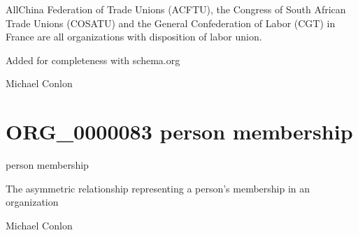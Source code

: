 \documentclass[letterpaper,10pt,english]{sphinxmanual}
\begin{document}
\begin{sphinxShadowBox}

\sphinxAtStartPar
All\sphinxhyphen{}China Federation of Trade Unions (ACFTU), the Congress of South African Trade Unions (COSATU) and the General Confederation of Labor (CGT) in France are all organizations with disposition of labor union.
\end{sphinxShadowBox}

\begin{sphinxShadowBox}

\sphinxAtStartPar
Added for completeness with schema.org
\end{sphinxShadowBox}

\begin{sphinxShadowBox}

\sphinxAtStartPar
Michael Conlon 
\end{sphinxShadowBox}
\begin{quote}
\label{\detokenize{doc-ORG_0000083:org-0000083}}\label{\detokenize{doc-ORG_0000083:person-membership}}\label{\detokenize{doc-ORG_0000083:org-0000083}}
\ignorespaces \end{quote}


\section{ORG\_0000083 \sphinxhyphen{} person membership}
\label{\detokenize{doc-ORG_0000083:org-0000083-person-membership}}\label{\detokenize{doc-ORG_0000083:index-0}}\label{\detokenize{doc-ORG_0000083::doc}}
\begin{sphinxShadowBox}

\sphinxAtStartPar
person membership
\end{sphinxShadowBox}

\begin{sphinxShadowBox}

\sphinxAtStartPar
The asymmetric relationship representing a person’s membership in an organization
\end{sphinxShadowBox}

\begin{sphinxShadowBox}

\sphinxAtStartPar
Michael Conlon 
\end{sphinxShadowBox}
\end{document}
